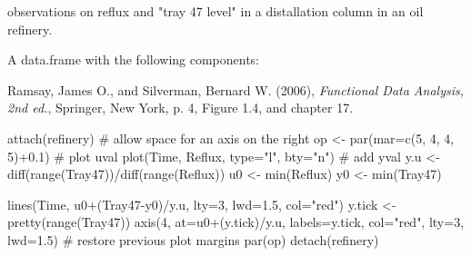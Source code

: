 \documentclass{article}
\begin{document}
\begin{Description} observations on reflux and "tray 47 level" in a distallation
column in an oil refinery.
\end{Description}
\begin{Format}\relax
A data.frame with the following components:  
\end{Format}
\begin{Source}\relax
Ramsay, James O., and Silverman, Bernard W. (2006), \emph{Functional
Data Analysis, 2nd ed.}, Springer, New York, p. 4, Figure 1.4, and
chapter 17.
\end{Source}
\begin{Examples}
\begin{ExampleCode}
    attach(refinery)
# allow space for an axis on the right 
    op <- par(mar=c(5, 4, 4, 5)+0.1)
# plot uval 
    plot(Time, Reflux, type="l", bty="n")
# add yval 
    y.u <- diff(range(Tray47))/diff(range(Reflux))
    u0 <- min(Reflux)
    y0 <- min(Tray47)

    lines(Time, u0+(Tray47-y0)/y.u, lty=3, lwd=1.5, col="red")
    y.tick <- pretty(range(Tray47))
    axis(4, at=u0+(y.tick)/y.u, labels=y.tick, col="red", lty=3,
            lwd=1.5)
# restore previous plot margins
    par(op)
    detach(refinery)
\end{ExampleCode}
\end{Examples}
\end{document}
